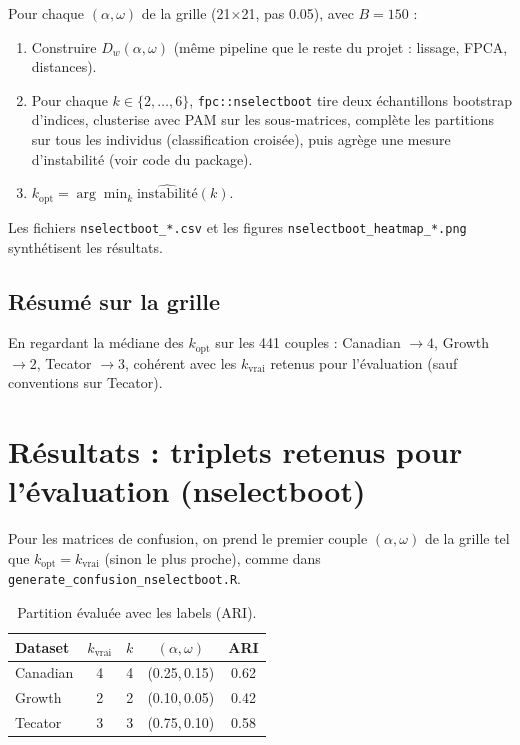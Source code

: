 \documentclass[11pt, a4paper]{article}
\begin{document}
Pour chaque $(\alpha,\omega)$ de la grille (21×21, pas 0.05), avec $B=150$ :

\begin{enumerate}
  \item Construire $D_w(\alpha,\omega)$ (même pipeline que le reste du projet :
    lissage, FPCA, distances).
  \item Pour chaque $k \in \{2,\ldots,6\}$, \texttt{fpc::nselectboot} tire deux
    échantillons bootstrap d'indices, clusterise avec PAM sur les sous-matrices,
    complète les partitions sur tous les individus (classification croisée), puis
    agrège une mesure d'instabilité (voir code du package).
  \item $k_\text{opt} = \arg\min_k \widehat{\text{instabilité}}(k)$.
\end{enumerate}

Les fichiers \texttt{nselectboot\_*.csv} et les figures
\texttt{nselectboot\_heatmap\_*.png} synthétisent les résultats.

\subsection{Résumé sur la grille}

En regardant la médiane des $k_\text{opt}$ sur les 441 couples : Canadian
$\to 4$, Growth $\to 2$, Tecator $\to 3$, cohérent avec les
$k_{\mathrm{vrai}}$ retenus pour l'évaluation (sauf conventions sur Tecator).

\section{Résultats : triplets retenus pour l'évaluation (nselectboot)}

Pour les matrices de confusion, on prend le premier couple $(\alpha,\omega)$ de
la grille tel que $k_\text{opt} = k_{\mathrm{vrai}}$ (sinon le plus proche), comme
dans \texttt{generate\_confusion\_nselectboot.R}.

\begin{table}[H]
\centering
\renewcommand{\arraystretch}{1.3}
\small
\begin{tabular}{lcccc}
\toprule
\textbf{Dataset} & $k_{\mathrm{vrai}}$ & $k$ & $(\alpha,\omega)$ & ARI \\
\midrule
Canadian & 4 & 4 & (0.25,\,0.15) & 0.62 \\
Growth   & 2 & 2 & (0.10,\,0.05) & 0.42 \\
Tecator  & 3 & 3 & (0.75,\,0.10) & 0.58 \\
\bottomrule
\end{tabular}
\caption{Partition évaluée avec les labels (ARI).}
\label{tab:nselectboot}
\end{table}
\end{document}
